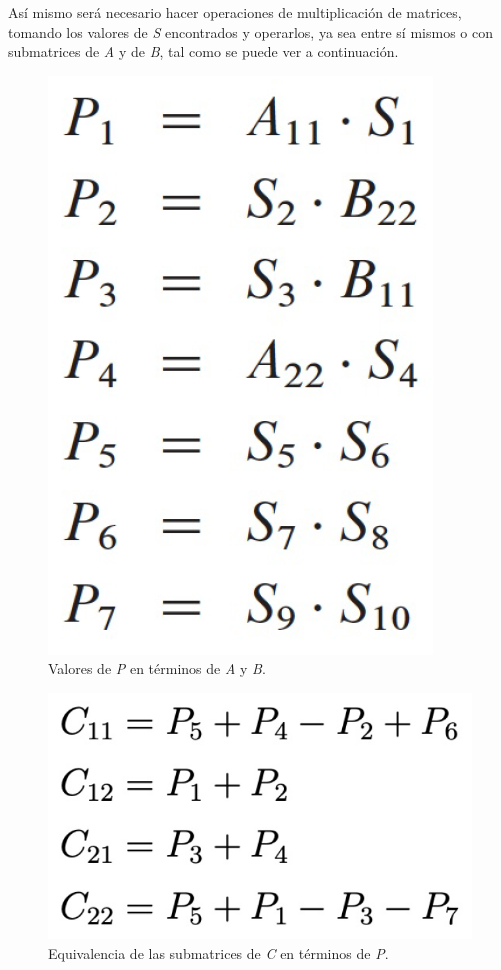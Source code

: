 \documentclass{article}
\begin{document}
Así mismo será necesario hacer operaciones de multiplicación de matrices, tomando los valores de \textit{S} encontrados y operarlos, ya sea entre sí mismos o con submatrices de \textit{A} y de \textit{B}, tal como se puede ver a continuación.

\begin{figure}[h]
    \begin{minipage}{1\textwidth}
        \centering
        \includegraphics[scale=0.25]{Imagen5.png}
        \caption{Valores de \textit{P} en términos de \textit{A} y \textit{B}.}
        \label{1}
    \end{minipage}
\end{figure}

\begin{figure}[h]
    \begin{minipage}{1\textwidth}
        \centering
        \includegraphics[scale=0.25]{Imagen6.png}
        \caption{Equivalencia de las submatrices de \textit{C} en términos de \textit{P}.}
        \label{1}
    \end{minipage}
\end{figure}
\end{document}

